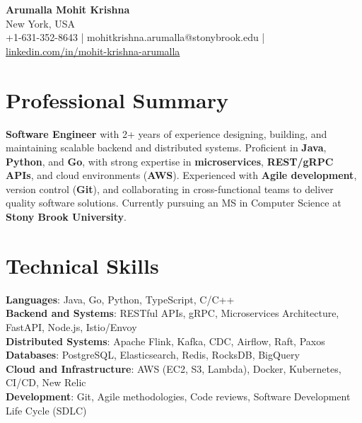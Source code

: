 \documentclass[letterpaper,11pt]{article}
\begin{document}
\begin{center}
  {\Large \textbf{Arumalla Mohit Krishna}} \\
  New York, USA \\
  +1-631-352-8643 \enspace | \enspace mohitkrishna.arumalla@stonybrook.edu \enspace | \enspace \href{https://www.linkedin.com/in/mohit-krishna-arumalla}{linkedin.com/in/mohit-krishna-arumalla}
\end{center}

\section{Professional Summary}
  \begin{itemize}[leftmargin=0.15in, label={}]
    \small{\item{
     \textbf{Software Engineer} with 2+ years of experience designing, building, and maintaining scalable backend and distributed systems. Proficient in \textbf{Java}, \textbf{Python}, and \textbf{Go}, with strong expertise in \textbf{microservices}, \textbf{REST/gRPC APIs}, and cloud environments (\textbf{AWS}). Experienced with \textbf{Agile development}, version control (\textbf{Git}), and collaborating in cross-functional teams to deliver quality software solutions. Currently pursuing an MS in Computer Science at \textbf{Stony Brook University}.
    }}
  \end{itemize}
\vspace{-16pt}

\section{Technical Skills}
 \begin{itemize}[leftmargin=0.15in, label={}]
    \small{\item{
     \textbf{Languages}: Java, Go, Python, TypeScript, C/C++ \\
     \textbf{Backend and Systems}: RESTful APIs, gRPC, Microservices Architecture, FastAPI, Node.js, Istio/Envoy \\
     \textbf{Distributed Systems}: Apache Flink, Kafka, CDC, Airflow, Raft, Paxos \\
     \textbf{Databases}: PostgreSQL, Elasticsearch, Redis, RocksDB, BigQuery \\
     \textbf{Cloud and Infrastructure}: AWS (EC2, S3, Lambda), Docker, Kubernetes, CI/CD, New Relic \\
     \textbf{Development}: Git, Agile methodologies, Code reviews, Software Development Life Cycle (SDLC)
    }}
 \end{itemize}
\vspace{-16pt}
\end{document}
